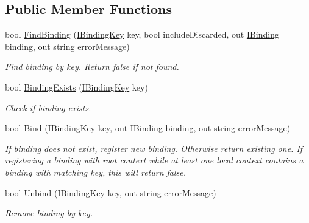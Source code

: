 \subsection*{Public Member Functions}
\begin{DoxyCompactItemize}
\item 
bool \mbox{\hyperlink{classcp_games_1_1core_1_1_rapid_m_v_c_1_1impl_1_1_binding_collection_a6bfcca10ac176a8e624072e848412877}{Find\+Binding}} (\mbox{\hyperlink{interfacecp_games_1_1core_1_1_rapid_m_v_c_1_1_i_binding_key}{I\+Binding\+Key}} key, bool include\+Discarded, out \mbox{\hyperlink{interfacecp_games_1_1core_1_1_rapid_m_v_c_1_1_i_binding}{I\+Binding}} binding, out string error\+Message)
\begin{DoxyCompactList}\small\item\em Find binding by key. Return false if not found. \end{DoxyCompactList}\item 
bool \mbox{\hyperlink{classcp_games_1_1core_1_1_rapid_m_v_c_1_1impl_1_1_binding_collection_a0ea0895570b8a80afacfe4786df4954b}{Binding\+Exists}} (\mbox{\hyperlink{interfacecp_games_1_1core_1_1_rapid_m_v_c_1_1_i_binding_key}{I\+Binding\+Key}} key)
\begin{DoxyCompactList}\small\item\em Check if binding exists. \end{DoxyCompactList}\item 
bool \mbox{\hyperlink{classcp_games_1_1core_1_1_rapid_m_v_c_1_1impl_1_1_binding_collection_aac34e91512dc87adf4cfd7196093dd5b}{Bind}} (\mbox{\hyperlink{interfacecp_games_1_1core_1_1_rapid_m_v_c_1_1_i_binding_key}{I\+Binding\+Key}} key, out \mbox{\hyperlink{interfacecp_games_1_1core_1_1_rapid_m_v_c_1_1_i_binding}{I\+Binding}} binding, out string error\+Message)
\begin{DoxyCompactList}\small\item\em If binding does not exist, register new binding. Otherwise return existing one. If registering a binding with root context while at least one local context contains a binding with matching key, this will return false. \end{DoxyCompactList}\item 
bool \mbox{\hyperlink{classcp_games_1_1core_1_1_rapid_m_v_c_1_1impl_1_1_binding_collection_a86fc516a730e0862d18c5a9cfb561f3c}{Unbind}} (\mbox{\hyperlink{interfacecp_games_1_1core_1_1_rapid_m_v_c_1_1_i_binding_key}{I\+Binding\+Key}} key, out string error\+Message)
\begin{DoxyCompactList}\small\item\em Remove binding by key. \end{DoxyCompactList}\item 

\end{DoxyCompactItemize}
